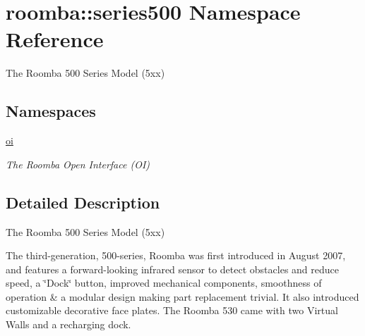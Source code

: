 \hypertarget{namespaceroomba_1_1series500}{\section{roomba\+:\+:series500 Namespace Reference}
\label{namespaceroomba_1_1series500}
}


The Roomba 500 Series Model (5xx)  


\subsection*{Namespaces}
\begin{DoxyCompactItemize}
\item 
 \hyperlink{namespaceroomba_1_1series500_1_1oi}{oi}
\begin{DoxyCompactList}\small\item\em The Roomba Open Interface (O\+I) \end{DoxyCompactList}\end{DoxyCompactItemize}


\subsection{Detailed Description}
The Roomba 500 Series Model (5xx) 

The third-\/generation, 500-\/series, Roomba was first introduced in August 2007, and features a forward-\/looking infrared sensor to detect obstacles and reduce speed, a \char`\"{}\+Dock\char`\"{} button, improved mechanical components, smoothness of operation \& a modular design making part replacement trivial. It also introduced customizable decorative face plates. The Roomba 530 came with two Virtual Walls and a recharging dock. 
